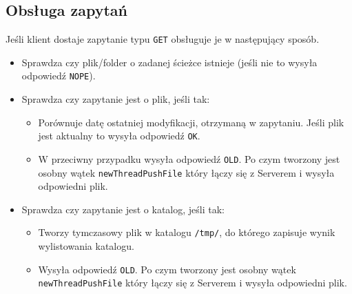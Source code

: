 \documentclass[a4paper,notitlepage]{article}
\begin{document}
\subsection{Obsługa zapytań}
Jeśli klient dostaje zapytanie typu \texttt{GET} obsługuje je w następujący sposób.
\begin{itemize}
\item Sprawdza czy plik/folder o zadanej ścieżce istnieje (jeśli nie to wysyła odpowiedź \texttt{NOPE}).
\item Sprawdza czy zapytanie jest o plik, jeśli tak:
    \begin{itemize}
    \item Porównuje datę ostatniej modyfikacji, otrzymaną w zapytaniu. Jeśli plik jest aktualny to wysyła odpowiedź \texttt{OK}.
    \item W przeciwny przypadku wysyła odpowiedź \texttt{OLD}. Po czym tworzony jest osobny wątek \texttt{newThreadPushFile} który łączy się z Serverem i wysyła odpowiedni plik.
    \end{itemize}
\item Sprawdza czy zapytanie jest o katalog, jeśli tak:
    \begin{itemize}
    \item Tworzy tymczasowy plik w katalogu \texttt{/tmp/}, do którego zapisuje wynik wylistowania katalogu.
    \item Wysyła odpowiedź \texttt{OLD}. Po czym tworzony jest osobny wątek \texttt{newThreadPushFile} który łączy się z Serverem i wysyła odpowiedni plik.
    \end{itemize}
\end{itemize}
\end{document}
